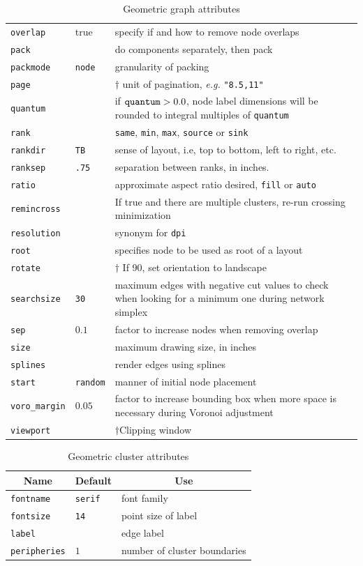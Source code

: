 \begin{table}[htbp]
\begin{tabular}[t]{|l|l|p{2.5in}|}
{\tt overlap} & true & specify if and how to remove node overlaps \\
{\tt pack} &  & do components separately, then pack \\
{\tt packmode} & {\tt node} & granularity of packing \\
{\tt page} & & $\dagger$ unit of pagination, {\it e.g.} {\tt "8.5,11"} \\
{\tt quantum} &  & if ${\tt quantum} > 0.0$, node label dimensions will be rounded to integral multiples of {\tt quantum} \\
{\tt rank} & & {\tt same}, {\tt min}, {\tt max}, {\tt source} or {\tt sink} \\
{\tt rankdir} & {\tt TB} & sense of layout, i.e, top to bottom, left to right, etc. \\
{\tt ranksep} & {\tt .75} & separation between ranks, in inches. \\
{\tt ratio} & & approximate aspect ratio desired, {\tt fill} or {\tt auto} \\
{\tt remincross} & & If true and there are multiple clusters, re-run crossing minimization \\
{\tt resolution} & & synonym for {\tt dpi}  \\
{\tt root} & & specifies node to be used as root of a layout \\ 
{\tt rotate} & & $\dagger$ If 90, set orientation to landscape \\
{\tt searchsize} & {\tt 30} & maximum edges with negative cut values to
check when looking for a minimum one during network simplex \\
{\tt sep} & $0.1$ & factor to increase nodes when removing overlap \\
{\tt size} & & maximum drawing size, in inches \\
{\tt splines} &  & render edges using splines \\
{\tt start} & {\tt random} & manner of initial node placement \\
{\tt voro\_margin} & $0.05$ & factor to increase bounding box when more space is necessary during Voronoi adjustment \\
{\tt viewport} & & $\dagger$Clipping window \\
\hline
\end{tabular}
\caption{Geometric graph attributes}
\label{tab:gattr_geom}
\end{table}
\begin{table}[htbp]\footnotesize
\centering
\begin{tabular}[t]{|l|l|p{2.5in}|} \hline
\multicolumn{1}{|c|}{Name} & \multicolumn{1}{c|}{Default} & \multicolumn{1}{c|}{Use} \\ \hline
{\tt fontname} & {\tt serif} & font family \\
{\tt fontsize} & {\tt 14} & point size of label \\
{\tt label} & & edge label \\
{\tt peripheries} & $1$ & number of cluster boundaries \\
\hline
\end{tabular}
\caption{Geometric cluster attributes}
\label{tab:cattr_geom}
\end{table}
